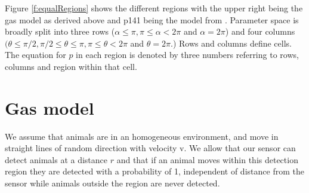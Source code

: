 Figure \ref{f:equalRegions} shows the different regions with the upper right being the gas model as derived above and p141 being the model from \citep{rowcliffe2008estimating}. Parameter space is broadly split into three rows ($\alpha \le \pi, \pi \le \alpha < 2\pi$ and $\alpha = 2\pi$) and four columns $(\theta \le \pi/2,  \pi/2 \le \theta \le \pi,  \pi \le \theta < 2\pi$ and $\theta = 2\pi$.) Rows and columns define cells. The equation for $p$ in each region is denoted by three numbers referring to rows, columns and region within that cell.


\section{Gas model} \label{gas}

We assume that animals are in an homogeneous environment, and move in straight lines of random direction with velocity v. We allow that our sensor can detect animals at a distance $r$ and that if an animal moves within this detection region they are detected with a probability of 1, independent of distance from the sensor while animals outside the region are never detected.

